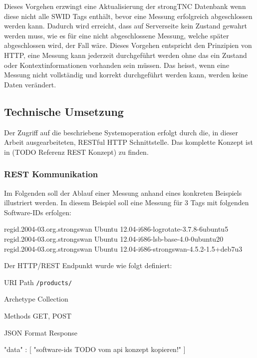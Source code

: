 Dieses Vorgehen erzwingt eine Aktualisierung der strongTNC Datenbank wenn diese nicht alle SWID Tags enthält, bevor eine Messung erfolgreich abgeschlossen werden kann. Dadurch wird erreicht, dass auf Serverseite kein Zustand gewahrt werden muss, wie es für eine nicht abgeschlossene Messung, welche später abgeschlossen wird, der Fall wäre. Dieses Vorgehen entspricht den Prinzipien von HTTP, eine Messung kann jederzeit durchgeführt werden ohne das ein Zustand oder Kontextinformationen vorhanden sein müssen. Das heisst, wenn eine Messung nicht vollständig und korrekt durchgeführt werden kann, werden keine Daten verändert. 



\subsection{Technische Umsetzung}
Der Zugriff auf die beschriebene Systemoperation erfolgt durch die, in dieser Arbeit ausgearbeiteten, RESTful HTTP Schnittstelle. Das komplette Konzept ist in (TODO Referenz REST Konzept) zu finden.

\subsubsection{REST Kommunikation}
Im Folgenden soll der Ablauf einer Messung anhand eines konkreten Beispiels illustriert werden.
In diesem Beispiel soll eine Messung für 3 Tags mit folgenden Software-IDs erfolgen:
\begin{textcode}
regid.2004-03.org.strongswan Ubuntu 12.04-i686-logrotate-3.7.8-6ubuntu5
regid.2004-03.org.strongswan Ubuntu 12.04-i686-lsb-base-4.0-0ubuntu20
regid.2004-03.org.strongswan Ubuntu 12.04-i686-strongswan-4.5.2-1.5+deb7u3
\end{textcode}

Der HTTP/REST Endpunkt wurde wie folgt definiert:
\begin{mdframed}[style=def]
\begin{description*}
	\item[URI Path] \texttt{/products/}
	\item[Archetype] Collection
	\item[Methods] GET, POST
	\item[JSON Format Response] \hfill
	
\begin{jsoncode}
{"data" : 
	[
	"software-ids TODO vom api konzept kopieren!" 
	]
}
\end{jsoncode}
\end{description*}
\end{mdframed}



